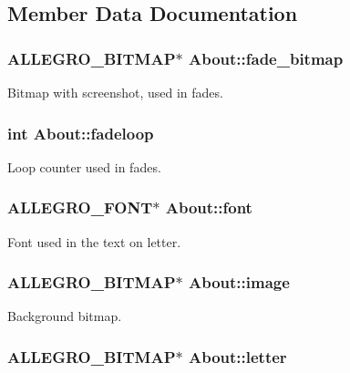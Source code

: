 \subsection{\-Member \-Data \-Documentation}
\hypertarget{structAbout_a0c80b08e1d60093504bed342b41e51c1}{
\subsubsection[{fade\-\_\-bitmap}]{\setlength{\rightskip}{0pt plus 5cm}\-A\-L\-L\-E\-G\-R\-O\-\_\-\-B\-I\-T\-M\-A\-P$\ast$ {\bf \-About\-::fade\-\_\-bitmap}}}\label{structAbout_a0c80b08e1d60093504bed342b41e51c1}
\-Bitmap with screenshot, used in fades. \hypertarget{structAbout_a3a7b7ae29163ae843671a2c2b5e8c1f0}{
\subsubsection[{fadeloop}]{\setlength{\rightskip}{0pt plus 5cm}int {\bf \-About\-::fadeloop}}}\label{structAbout_a3a7b7ae29163ae843671a2c2b5e8c1f0}
\-Loop counter used in fades. \hypertarget{structAbout_ad14358b4942c0260e502a65b98732f93}{
\subsubsection[{font}]{\setlength{\rightskip}{0pt plus 5cm}\-A\-L\-L\-E\-G\-R\-O\-\_\-\-F\-O\-N\-T$\ast$ {\bf \-About\-::font}}}\label{structAbout_ad14358b4942c0260e502a65b98732f93}
\-Font used in the text on letter. \hypertarget{structAbout_a9e724aa84d322d2bfff5c00109492a1d}{
\subsubsection[{image}]{\setlength{\rightskip}{0pt plus 5cm}\-A\-L\-L\-E\-G\-R\-O\-\_\-\-B\-I\-T\-M\-A\-P$\ast$ {\bf \-About\-::image}}}\label{structAbout_a9e724aa84d322d2bfff5c00109492a1d}
\-Background bitmap. \hypertarget{structAbout_aa46380e60629ac39d782e18dc6a08f8e}{
\subsubsection[{letter}]{\setlength{\rightskip}{0pt plus 5cm}\-A\-L\-L\-E\-G\-R\-O\-\_\-\-B\-I\-T\-M\-A\-P$\ast$ {\bf \-About\-::letter}}}\label{structAbout_aa46380e60629ac39d782e18dc6a08f8e}
